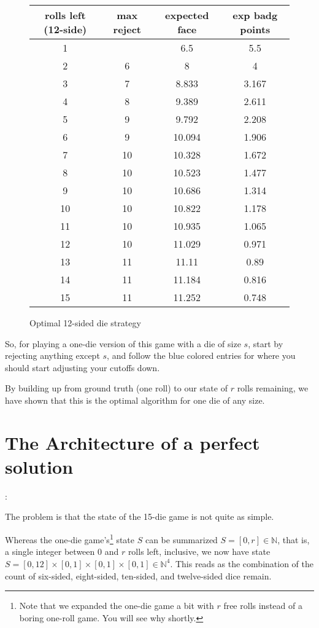 \documentclass[11pt, oneside]{article} 	%
\begin{document}
\begin{figure}[!htb]
\begin{tabular}{c | c c c}
rolls left (12-side) & max reject & expected face & exp badg points \\
\hline

1 &  & 6.5 & 5.5 \\
2 & \cellcolor{cyan} 6 & 8 & 4 \\
3 & \cellcolor{cyan} 7 & 8.833 & 3.167 \\
4 &\cellcolor{cyan}  8 & 9.389 & 2.611 \\
5 & 9 & 9.792 & 2.208 \\
6 & \cellcolor{cyan} 9 & 10.094 & 1.906 \\
7 & 10 & 10.328 & 1.672 \\
8 & 10 & 10.523 & 1.477 \\
9 & 10 & 10.686 & 1.314 \\
10 & 10 & 10.822 & 1.178 \\
11 & 10 & 10.935 & 1.065 \\
12 & \cellcolor{cyan} 10 & 11.029 & 0.971 \\
13 & 11 & 11.11 & 0.89 \\
14 & 11 & 11.184 & 0.816 \\
15 & 11 & 11.252 & 0.748 \\
\end{tabular}
\caption{Optimal 12-sided die strategy}
\label{fig:optimal12}
\end{figure}

So, for playing a one-die version of this game with a die of size $s$, start by rejecting anything except $s$, and follow the blue colored entries for where you should start adjusting your cutoffs down.  

By building up from ground truth (one roll) to our state of $r$ rolls remaining, we have shown that this is the optimal algorithm for one die of any size.

\section{The Architecture of a perfect solution} \label{section:solve-perfect}: 

The problem is that the state of the 15-die game is not quite as simple.

Whereas the one-die game's\footnote{Note that we expanded the one-die game a bit with $r$ free rolls instead of a boring one-roll game.  You will see why shortly.} state $S$  can be summarized $S = [0,r] \in \mathbb{N}$, that is, a single integer between $0$ and $r$ rolls left, inclusive, we now have state $S = [0,12] \times [0,1] \times [0,1] \times [0,1] \in \mathbb{N}^4$.  This reads as the combination of the count of six-sided, eight-sided, ten-sided, and twelve-sided dice remain.  
\end{document}
